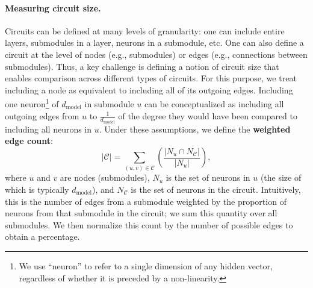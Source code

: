 \documentclass{article}
\theoremstyle{plain}
\theoremstyle{definition}
\theoremstyle{remark}
\begin{document}
\paragraph{Measuring circuit size.} Circuits can be defined at many levels of granularity: one can include entire layers, submodules in a layer, neurons in a submodule, etc. One can also define a circuit at the level of nodes (e.g., submodules) or edges (e.g., connections between submodules).
Thus, a key challenge is defining a notion of circuit size that enables comparison across different types of circuits. For this purpose, we treat including a node as equivalent to including all of its outgoing edges. Including one neuron\footnote{We use ``neuron'' to refer to a single dimension of any hidden vector, regardless of whether it is preceded by a non-linearity.} of $d_\text{model}$ in submodule $u$ can be conceptualized as including all outgoing edges from $u$ to $\frac{1}{d_\text{model}}$ of the degree they would have been compared to including all neurons in $u$. Under these assumptions, we define the \textbf{weighted edge count}:
\begin{equation}
|\mathcal{C}| = \sum_{(u,v) \in \mathcal{C}} \left(\frac{|N_{u} \cap N_{\mathcal{C}}|}{|N_u|}\right),
\end{equation}
where $u$ and $v$ are nodes (submodules), $N_u$ is the set of neurons in $u$ (the size of which is typically $d_\text{model}$), and $N_\mathcal{C}$ is the set of neurons in the circuit. Intuitively, this is the number of edges from a submodule weighted by the proportion of neurons from that submodule in the circuit; we sum this quantity over all submodules. We then normalize this count by the number of possible edges to obtain a percentage.
\end{document}

